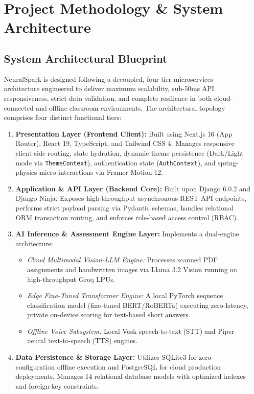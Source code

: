 \chapter{Project Methodology \& System Architecture}

\section{System Architectural Blueprint}
NeuralSpark is designed following a decoupled, four-tier microservices architecture engineered to deliver maximum scalability, sub-50ms API responsiveness, strict data validation, and complete resilience in both cloud-connected and offline classroom environments. The architectural topology comprises four distinct functional tiers:
\begin{enumerate}[leftmargin=*]
    \item \textbf{Presentation Layer (Frontend Client):} Built using Next.js 16 (App Router), React 19, TypeScript, and Tailwind CSS 4. Manages responsive client-side routing, state hydration, dynamic theme persistence (Dark/Light mode via \texttt{ThemeContext}), authentication state (\texttt{AuthContext}), and spring-physics micro-interactions via Framer Motion 12.
    \item \textbf{Application \& API Layer (Backend Core):} Built upon Django 6.0.2 and Django Ninja. Exposes high-throughput asynchronous REST API endpoints, performs strict payload parsing via Pydantic schemas, handles relational ORM transaction routing, and enforces role-based access control (RBAC).
    \item \textbf{AI Inference \& Assessment Engine Layer:} Implements a dual-engine architecture:
    \begin{itemize}
        \item \textit{Cloud Multimodal Vision-LLM Engine:} Processes scanned PDF assignments and handwritten images via Llama 3.2 Vision running on high-throughput Groq LPUs.
        \item \textit{Edge Fine-Tuned Transformer Engine:} A local PyTorch sequence classification model (fine-tuned BERT/RoBERTa) executing zero-latency, private on-device scoring for text-based short answers.
        \item \textit{Offline Voice Subsystem:} Local Vosk speech-to-text (STT) and Piper neural text-to-speech (TTS) engines.
    \end{itemize}
    \item \textbf{Data Persistence \& Storage Layer:} Utilizes SQLite3 for zero-configuration offline execution and PostgreSQL for cloud production deployments. Manages 14 relational database models with optimized indexes and foreign-key constraints.
\end{enumerate}

